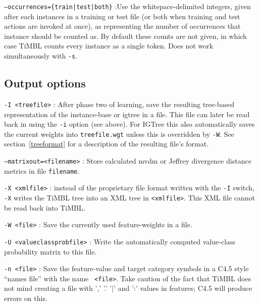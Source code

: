 \documentclass{book}
\begin{document}
\begin{description}
\item {\tt --occurrences=\{train|test|both\}} :Use the
  whitepace-delimited integers, given after each instances in a
  training or test file (or both when training and test actions are
  invoked at once), as representing the number of occurrences that
  instance should be counted as. By default these counts are not
  given, in which case TiMBL counts every instance as a single
  token. Does not work simultaneously with {\tt -s}.
\end{description}

\subsection{Output options}

\begin{description}

\item {\tt -I <treefile>} : After phase two of learning, save
  the resulting tree-based representation of the instance-base or {\sc
    igtree} in a file. This file can later be read back in using the
  {\tt -i} option (see above). For {\sc IGTree} this also automatically
  saves the current weights into {\tt treefile.wgt} unless this is
  overridden by {\tt -W}.
  See section~\ref{treeformat} for a description of the resulting file's format.

\item {\tt --matrixout=<filename>} : Store calculated {\sc mvdm} or
  Jeffrey divergence distance metrics in file {\tt filename}.

\item {\tt -X <xmlfile>} : instead of the proprietary file format
  written with the {\tt -I} switch, {\tt -X} writes the TiMBL tree
  into an XML tree in {\tt <xmlfile>}. This XML file cannot be read
  back into TiMBL.

\item {\tt -W <file>} : Save the currently used feature-weights in a
file.

\item {\tt -U <valueclassprobfile>} : Write the automatically computed
value-class probability matrix to this file.

\item {\tt -n <file>} : Save the feature-value and target category
symbols in a C4.5 style ``names file'' with the name {\tt
<file>}. Take caution of the fact that TiMBL does not mind creating a
file with ',' '.' '$|$' and ':' values in features; C4.5 will produce errors on this.


\end{description}
\end{document}
